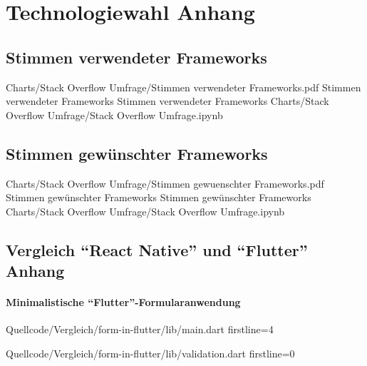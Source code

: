 \chapter{Technologiewahl Anhang} 

\section{Stimmen verwendeter Frameworks} 

\begin{alexfigurewithnotebook}{Charts/Stack Overflow Umfrage/Stimmen verwendeter Frameworks.pdf}
	{Stimmen verwendeter Frameworks}
	{Stimmen verwendeter Frameworks}
	{Charts/Stack Overflow Umfrage/Stack Overflow Umfrage.ipynb}
	{}
	\label{fig:StimmenVerwendeterFrameworks}
\end{alexfigurewithnotebook}

\section{Stimmen gewünschter Frameworks} 


\begin{alexfigurewithnotebook}{Charts/Stack Overflow Umfrage/Stimmen gewuenschter Frameworks.pdf}
	{Stimmen gewünschter Frameworks}
	{Stimmen gewünschter Frameworks}
	{Charts/Stack Overflow Umfrage/Stack Overflow Umfrage.ipynb}
	{}
	\label{fig:StimmenGewuenschterFrameworks}
\end{alexfigurewithnotebook}


\section{Vergleich \enquote{React Native} und \enquote{Flutter} Anhang} 
\renewcommand{\fcolorbox}[4][]{#4}

\clearpage
\subsubsection{Minimalistische \enquote{Flutter}-Formularanwendung}

\begin{alexlisting}{}{}
  {Quellcode/Vergleich/form-in-flutter/lib/main.dart}
  {firstline=4}
  \label{lst:Schritt1KlasseLetzterStatus}
\end{alexlisting}

\begin{alexlisting}{}{}
  {Quellcode/Vergleich/form-in-flutter/lib/validation.dart}
  {firstline=0}
  \label{lst:Schritt1KlasseLetzterStatus}
\end{alexlisting}

